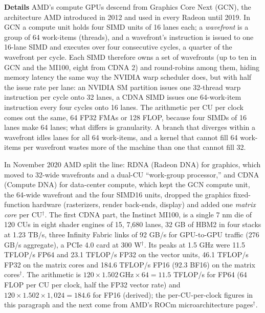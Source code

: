 \documentclass[11pt,letterpaper]{article}
\newcommand{\para}[1]{\medskip\noindent\textbf{#1}\quad}
\begin{document}
\para{Details} AMD's compute GPUs descend from Graphics Core Next (GCN), the architecture AMD introduced in 2012 and used in every Radeon until 2019. In GCN a compute unit holds four SIMD units of 16 lanes each; a \emph{wavefront} is a group of 64 work-items (threads), and a wavefront's instruction is issued to one 16-lane SIMD and executes over four consecutive cycles, a quarter of the wavefront per cycle. Each SIMD therefore owns a set of wavefronts (up to ten in GCN and the MI100, eight from CDNA 2) and round-robins among them, hiding memory latency the same way the NVIDIA warp scheduler does, but with half the issue rate per lane: an NVIDIA SM partition issues one 32-thread warp instruction per cycle onto 32 lanes, a CDNA SIMD issues one 64-work-item instruction every four cycles onto 16 lanes. The arithmetic per CU per clock comes out the same, 64 FP32 FMAs or 128 FLOP, because four SIMDs of 16 lanes make 64 lanes; what differs is granularity. A branch that diverges within a wavefront idles lanes for all 64 work-items, and a kernel that cannot fill 64 work-items per wavefront wastes more of the machine than one that cannot fill 32.

In November 2020 AMD split the line: RDNA (Radeon DNA) for graphics, which moved to 32-wide wavefronts and a dual-CU ``work-group processor,'' and CDNA (Compute DNA) for data-center compute, which kept the GCN compute unit, the 64-wide wavefront and the four SIMD16 units, dropped the graphics fixed-function hardware (rasterizers, render back-ends, display) and added one \emph{matrix core} per CU$^\dagger$. The first CDNA part, the Instinct MI100, is a single 7 nm die of 120 CUs in eight shader engines of 15, 7{,}680 lanes, 32 GB of HBM2 in four stacks at 1.23 TB/s, three Infinity Fabric links of 92 GB/s for GPU-to-GPU traffic (276 GB/s aggregate), a PCIe 4.0 card at 300 W$^\dagger$. Its peaks at 1.5 GHz were 11.5 TFLOP/s FP64 and 23.1 TFLOP/s FP32 on the vector units, 46.1 TFLOP/s FP32 on the matrix cores and 184.6 TFLOP/s FP16 (92.3 BF16) on the matrix cores$^\dagger$. The arithmetic is $120 \times 1.502\,\text{GHz} \times 64 = 11.5$ TFLOP/s for FP64 (64 FLOP per CU per clock, half the FP32 vector rate) and $120 \times 1.502 \times 1{,}024 = 184.6$ for FP16 (derived); the per-CU-per-clock figures in this paragraph and the next come from AMD's ROCm microarchitecture pages$^\dagger$.
\end{document}
